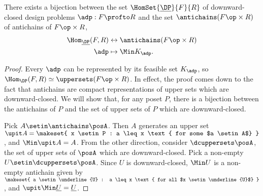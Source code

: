 \begin{lemma}
    There exists a bijection between the set $\HomSet{\underline{\DP}}{F}{R}$ of downward-closed design problems $\adp : F \profto R$ and the set $\antichains (F\op \times R)$ of antichains of $F\op \times R$, %
    \begin{equation}
        \begin{aligned}
            \Hom_{\underline{\DP}}(F,R) & \leftrightarrow \antichains (F\op \times R) \\
            \adp                        & \mapsto \Min K_\adp.
        \end{aligned}
    \end{equation}
\end{lemma}
\begin{proof}
    Every $\adp$ can be represented by its feasible set $K_\adp$, so $\Hom_\DP(F,R) \simeq \uppersets (F\op \times R)$.
    In effect, the proof comes down to the fact that antichains are compact representations of upper sets which are downward-closed.
    We will show that, for any poset $P$, there is a bijection between the antichains of $P$ and the set of upper sets of $P$ which are downward-closed.

    Pick $A \setin \antichains\posA$.
    Then $A$ generates an upper set $\upit A = \makeset{ x \setin P : a \leq x \text{ for some $a \setin A$} }$, and $\Min \upit A = A$.
    From the other direction, consider $\dcuppersets \posA$, the set of upper sets of $\posA$ which are downward-closed.
    Pick a non-empty $U \setin \dcuppersets \posA$.
    Since $U$ is downward-closed, $\Min U$ is a non-empty antichain given by $\makeset{ a \setin \underline{U} : a \leq x \text{ for all $x \setin \underline{U}$} }$, and $\upit \Min \underline{U} = \underline{U}$.
\end{proof}

